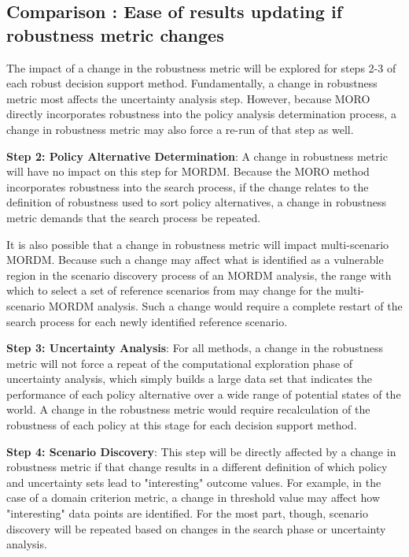     \subsection{Comparison \thecomparison : Ease of results updating if robustness metric changes} 
    The impact of a change in the robustness metric will be explored for steps 2-3 of each robust decision support method. Fundamentally, a change in robustness metric most affects the uncertainty analysis step. However, because MORO directly incorporates robustness into the policy analysis determination process, a change in robustness metric may also force a re-run of that step as well. 
    
    \textbf{Step 2: Policy Alternative Determination}: A change in robustness metric will have no impact on this step for MORDM. Because the MORO method incorporates robustness into the search process, if the change relates to the definition of robustness used to sort policy alternatives, a change in robustness metric demands that the search process be repeated. 
    
    It is also possible that a change in robustness metric will impact multi-scenario MORDM. Because such a change may affect what is identified as a vulnerable region in the scenario discovery process of an MORDM analysis, the range with which to select a set of reference scenarios from may change for the multi-scenario MORDM analysis. Such a change would require a complete restart of the search process for each newly identified reference scenario.
        
    \textbf{Step 3: Uncertainty Analysis}: For all methods, a change in the robustness metric will not force a repeat of the computational exploration phase of uncertainty analysis, which simply builds a large data set that indicates the performance of each policy alternative over a wide range of potential states of the world. A change in the robustness metric would require recalculation of the robustness of each policy at this stage for each decision support method. 
    
    \textbf{Step 4: Scenario Discovery}: This step will be directly affected by a change in robustness metric if that change results in a different definition of which policy and uncertainty sets lead to "interesting" outcome values. For example, in the case of a domain criterion metric, a change in threshold value may affect how "interesting" data points are identified. For the most part, though, scenario discovery will be repeated based on changes in the search phase or uncertainty analysis. 

